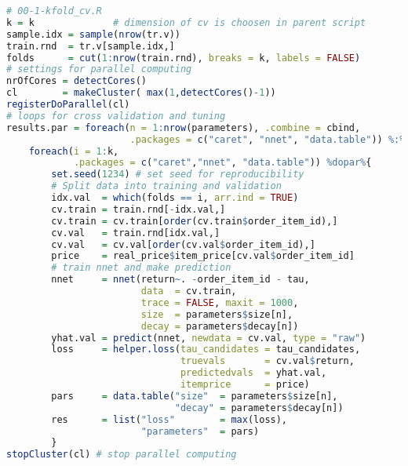 \documentclass[10pt,a4paper]{article}
\begin{document}
\begin{lstlisting}[language=r]
# 00-1-kfold_cv.R
k = k              # dimension of cv is choosen in parent script
sample.idx = sample(nrow(tr.v))
train.rnd  = tr.v[sample.idx,] 
folds      = cut(1:nrow(train.rnd), breaks = k, labels = FALSE)
# settings for parallel computing
nrOfCores = detectCores()
cl        = makeCluster( max(1,detectCores()-1))
registerDoParallel(cl)
# loops for cross validation and tuning
results.par = foreach(n = 1:nrow(parameters), .combine = cbind, 
                      .packages = c("caret", "nnet", "data.table")) %:%
    foreach(i = 1:k, 
            .packages = c("caret","nnet", "data.table")) %dopar%{
        set.seed(1234) # set seed for reproducibility 
        # Split data into training and validation
        idx.val  = which(folds == i, arr.ind = TRUE)
        cv.train = train.rnd[-idx.val,]
        cv.train = cv.train[order(cv.train$order_item_id),]
        cv.val   = train.rnd[idx.val,]
        cv.val   = cv.val[order(cv.val$order_item_id),]
        price    = real_price$item_price[cv.val$order_item_id]
        # train nnet and make prediction
        nnet     = nnet(return~. -order_item_id - tau, 
                        data  = cv.train,
                        trace = FALSE, maxit = 1000,
                        size  = parameters$size[n], 
                        decay = parameters$decay[n])
        yhat.val = predict(nnet, newdata = cv.val, type = "raw")
        loss     = helper.loss(tau_candidates = tau_candidates, 
                               truevals       = cv.val$return, 
                               predictedvals  = yhat.val, 
                               itemprice      = price)
        pars     = data.table("size"  = parameters$size[n],
                              "decay" = parameters$decay[n])
        res      = list("loss"        = max(loss), 
                        "parameters"  = pars)
        }
stopCluster(cl) # stop parallel computing

\end{lstlisting}
\end{document}
